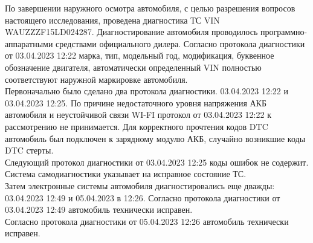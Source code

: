  По завершении наружного осмотра автомобиля, с целью разрешения вопросов настоящего исследования, проведена диагностика ТС VIN WAUZZZF15LD024287.  Диагностирование автомобиля проводилось программно-аппаратными средствами   официального дилера.  Согласно протокола диагностики от 03.04.2023  12:22 марка, тип, модельный год, модификация, буквенное обозначение двигателя, автоматически определенный VIN полностью соответствуют наружной маркировке автомобиля.\\
 Первоначально было сделано два протокола диагностики.  03.04.2023  12:22 и  03.04.2023  12:25.  По причине недостаточного уровня  напряжения АКБ автомобиля и неустойчивой связи WI-FI протокол от 03.04.2023 12:22 к рассмотрению не принимается.  Для корректного прочтения  кодов DTC автомобиль был подключен к зарядному модулю АКБ, случайно возникшие коды DTC стерты.  \\
 Следующий протокол диагностики от 03.04.2023  12:25 коды ошибок не содержит. Система самодиагностики  указывает на исправное состояние ТС.\\
Затем  электронные системы автомобиля диагностировались еще дважды: 03.04.2023  12:49 и  05.04.2023 в 12:26. 
Согласно протокола диагностики от 03.04.2023  12:49  автомобиль технически исправен. \\
Согласно протокола диагностики от  05.04.2023  12:26  автомобиль технически исправен.\\


